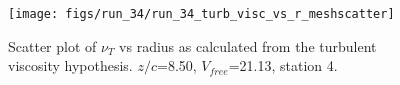 \begin{figure}[H]
\centering
\texttt{[image: figs/run\_34/run\_34\_turb\_visc\_vs\_r\_meshscatter]}
\caption{Scatter plot of $\nu_T$ vs radius as calculated from the turbulent viscosity hypothesis. $z/c$=8.50, $V_{free}$=21.13, station 4.}
\label{fig:run_34_turb_visc_vs_r_meshscatter}
\end{figure}


